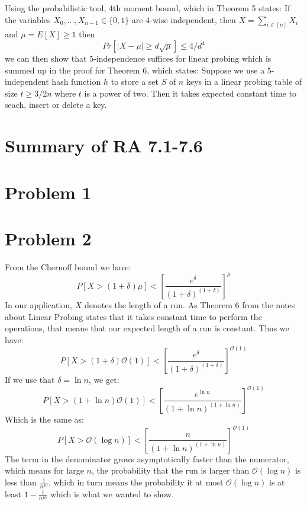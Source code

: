 \documentclass[a4paper, fleqn]{article}
\begin{document}
Using the probabilistic tool, 4th moment bound, which in Theorem 5 states: If the variables $X_0, \ldots, X_{n-1}\in\{0,1\}$ are $4$-wise independent, then $X=\sum_{i\in [n]}X_i$ and $\mu=E[X]\geq 1$ then
$$
  Pr[|X-\mu|\geq d\sqrt{\mu}]\leq 4/d^4
$$
we can then show that 5-independence suffices for linear probing which is summed up in the proof for Theorem 6, which states: Suppose we use a 5-independent hash function $h$ to store a set $S$ of $n$ keys in a linear probing table of size $t\geq 3/2n$ where $t$ is a power of two. Then it takes expected constant time to seach, insert or delete a key.

\section*{Summary of RA 7.1-7.6}

\section*{Problem 1}

\section*{Problem 2}
From the Chernoff bound we have:
$$
P[X>(1+\delta)\mu]<\left[ \frac{e^\delta}{(1+\delta)^{(1+\delta)}}\right]^\mu
$$
In our application, $X$ denotes the length of a run. As Theorem 6 from the notes about Linear Probing states that it takes constant time to perform the operations, that means that our expected length of a run is constant. Thus we have:
$$
P[X>(1+\delta)\mathcal{O}(1)]<\left[ \frac{e^\delta}{(1+\delta)^{(1+\delta)}}\right]^{\mathcal{O}(1)}
$$
If we use that $\delta = \ln n$, we get:
$$
P[X>(1+\ln n)\mathcal{O}(1)]<\left[ \frac{e^{\ln n}}{(1+\ln n)^{(1+\ln n)}}\right]^{\mathcal{O}(1)}
$$
Which is the same as:
$$
P[X>\mathcal{O}(\log n)]<\left[ \frac{n}{(1+\ln n)^{(1+\ln n)}}\right]^{\mathcal{O}(1)}
$$
The term in the denominator grows asymptotically faster than the numerator, which means for large $n$, the probability that the run is larger than $\mathcal{O}(\log n)$ is less than $\frac{1}{n^{10}}$, which in turn means the probability it at most $\mathcal{O}(\log n)$ is at least $1-\frac{1}{n^{10}}$ which is what we wanted to show.
\end{document}
